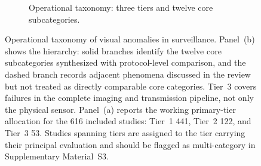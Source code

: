 \documentclass[10pt,a4paper]{article}
\newif\ifprovisionalnumbers
\newcommand{\pnum}[1]{\ifprovisionalnumbers\textcolor{orange!75!black}{\textbf{#1}}\else #1\fi}
\begin{document}
\begin{figure}[!t]
\begin{subfigure}{\textwidth}
\caption{Operational taxonomy: three tiers and twelve core subcategories.}\label{fig:tax_b}
\end{subfigure}
\caption{Operational taxonomy of visual anomalies in surveillance. Panel~(b) shows the hierarchy: solid branches identify the twelve core subcategories synthesized with protocol-level comparison, and the dashed branch records adjacent phenomena discussed in the review but not treated as directly comparable core categories. Tier~3 covers failures in the complete imaging and transmission pipeline, not only the physical sensor. Panel~(a) reports the working primary-tier allocation for the \pnum{616} included studies: Tier~1 \pnum{441}, Tier~2 \pnum{122}, and Tier~3 \pnum{53}. Studies spanning tiers are assigned to the tier carrying their principal evaluation and should be flagged as multi-category in Supplementary Material~S3. \ifprovisionalnumbers\textbf{The three-tier allocation is a provisional author-review reallocation of the manuscript's earlier multi-category counts and must be verified study by study before submission.}\fi}
\label{fig:taxonomy_tree}
\end{figure}
\end{document}
